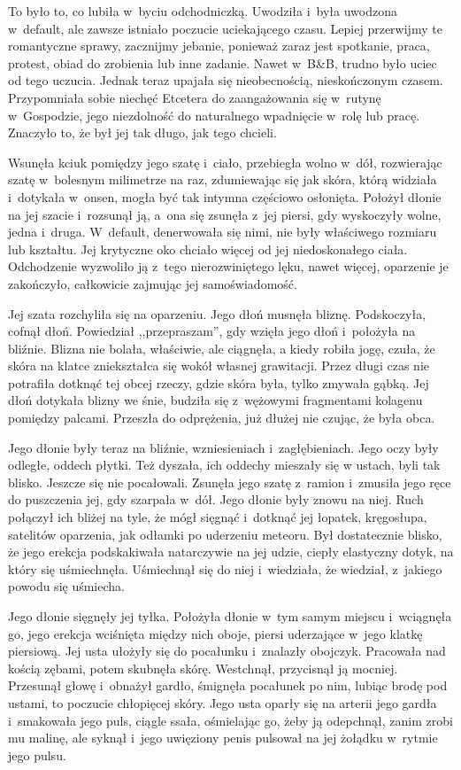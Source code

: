 \documentclass[oneside,polish,11pt,sfheadings]{mwbk}
\begin{document}
To było to, co lubiła w~byciu odchodniczką. Uwodziła i~była uwodzona w~default, ale zawsze istniało poczucie uciekającego czasu. Lepiej
przerwijmy te romantyczne sprawy, zacznijmy jebanie, ponieważ zaraz jest
spotkanie, praca, protest, obiad do zrobienia lub inne zadanie. Nawet w~B\&B, trudno było uciec od tego uczucia. Jednak teraz upajała się
nieobecnością, nieskończonym czasem. Przypomniała sobie niechęć Etcetera
do zaangażowania się w~rutynę w~Gospodzie, jego niezdolność do
naturalnego wpadnięcie w~rolę lub pracę. Znaczyło to, że był jej tak
długo, jak tego chcieli.

Wsunęła kciuk pomiędzy jego szatę i~ciało, przebiegła wolno w~dół,
rozwierając szatę w~bolesnym milimetrze na raz, zdumiewając się jak
skóra, którą widziała i~dotykała w~onsen, mogła być tak intymna
częściowo osłonięta. Położył dłonie na jej szacie i~rozsunął ją, a~ona
się zsunęła z~jej piersi, gdy wyskoczyły wolne, jedna i~druga. W~default, denerwowała się nimi, nie były właściwego rozmiaru lub
kształtu. Jej krytyczne oko chciało więcej od jej niedoskonałego ciała.
Odchodzenie wyzwoliło ją z~tego nierozwiniętego lęku, nawet więcej,
oparzenie je zakończyło, całkowicie zajmując jej samoświadomość.

Jej szata rozchyliła się na oparzeniu. Jego dłoń musnęła bliznę.
Podskoczyła, cofnął dłoń. Powiedział ,,przepraszam'', gdy wzięła jego
dłoń i~położyła na bliźnie. Blizna nie bolała, właściwie, ale ciągnęła,
a kiedy robiła jogę, czuła, że skóra na klatce zniekształca się wokół
własnej grawitacji. Przez długi czas nie potrafiła dotknąć tej obcej
rzeczy, gdzie skóra była, tylko zmywała gąbką. Jej dłoń dotykała blizny
we śnie, budziła się z~wężowymi fragmentami kolagenu pomiędzy palcami.
Przeszła do odprężenia, już dłużej nie czując, że była obca.

Jego dłonie były teraz na bliźnie, wzniesieniach i~zagłębieniach. Jego
oczy były odległe, oddech płytki. Też dyszała, ich oddechy mieszały się
w ustach, byli tak blisko. Jeszcze się nie pocałowali. Zsunęła jego
szatę z~ramion i~zmusiła jego ręce do puszczenia jej, gdy szarpała w~dół. Jego dłonie były znowu na niej. Ruch połączył ich bliżej na tyle,
że mógł sięgnąć i~dotknąć jej łopatek, kręgosłupa, satelitów oparzenia,
jak odłamki po uderzeniu meteoru. Był dostatecznie blisko, że jego
erekcja podskakiwała natarczywie na jej udzie, ciepły elastyczny dotyk,
na który się uśmiechnęła. Uśmiechnął się do niej i~wiedziała, że
wiedział, z~jakiego powodu się uśmiecha.

Jego dłonie sięgnęły jej tyłka. Położyła dłonie w~tym samym miejscu i~wciągnęła go, jego erekcja wciśnięta między nich oboje, piersi
uderzające w~jego klatkę piersiową. Jej usta ułożyły się do pocałunku i~znalazły obojczyk. Pracowała nad kością zębami, potem skubnęła skórę.
Westchnął, przycisnął ją mocniej. Przesunął głowę i~obnażył gardło,
śmignęła pocałunek po nim, lubiąc brodę pod ustami, to poczucie
chłopięcej skóry. Jego usta oparły się na arterii jego gardła i~smakowała jego puls, ciągle ssała, ośmielając go, żeby ją odepchnął,
zanim zrobi mu malinę, ale syknął i~jego uwięziony penis pulsował na jej
żołądku w~rytmie jego pulsu.
\end{document}
